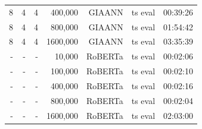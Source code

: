 \begin{table}[H]
\begin{tabular}{rrrrrrr}
8 & 4 & 4 & 400,000 & GIAANN  & ts eval & 00:39:26 \\
8 & 4 & 4 & 800,000 & GIAANN  & ts eval & 01:54:42 \\
8 & 4 & 4 & 1600,000 & GIAANN  & ts eval & 03:35:39 \\
- & - & - & 10,000  & RoBERTa & ts eval & 00:02:06 \\
- & - & - & 100,000 & RoBERTa & ts eval & 00:02:10 \\
- & - & - & 400,000 & RoBERTa & ts eval & 00:02:16 \\
- & - & - & 800,000 & RoBERTa & ts eval & 00:02:04 \\
- & - & - & 1600,000 & RoBERTa & ts eval & 02:03:00 \\
\bottomrule
\end{tabular}
\end{table}